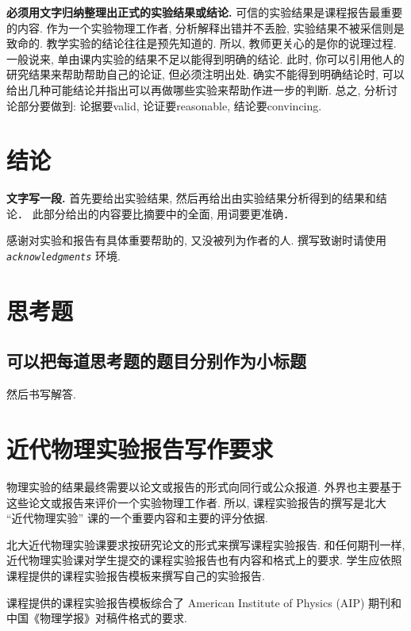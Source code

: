 \documentclass[font=default]{mpltx}
\newcommand{\note}[1]{{\color{gray}#1}}
\newcommand*\env[1]{\textit{\texttt{#1}}}
\begin{document}
\textbf{必须用文字归纳整理出正式的实验结果或结论.}
可信的实验结果是课程报告最重要的内容.
作为一个实验物理工作者, 分析解释出错并不丢脸, 实验结果不被采信则是致命的.
教学实验的结论往往是预先知道的.
所以, 教师更关心的是你的说理过程.
一般说来, 单由课内实验的结果不足以能得到明确的结论.
此时, 你可以引用他人的研究结果来帮助帮助自己的论证, 但必须注明出处.
确实不能得到明确结论时, 可以给出几种可能结论并指出可以再做哪些实验来帮助作进一步的判断.
总之, 分析讨论部分要做到: 论据要valid, 论证要reasonable, 结论要convincing.

\section{结论}
\textbf{文字写一段.}
首先要给出实验结果, 然后再给出由实验结果分析得到的结果和结论．
此部分给出的内容要比摘要中的全面, 用词要更准确．

\begin{acknowledgments}
  感谢对实验和报告有具体重要帮助的, 又没被列为作者的人.
  \note{撰写致谢时请使用 \env{acknowledgments} 环境.}
\end{acknowledgments}



\clearpage %
\appendix %
\section{思考题}\label{app:exercise}
\subsection{可以把每道思考题的题目分别作为小标题}
然后书写解答.

\section{近代物理实验报告写作要求}

物理实验的结果最终需要以论文或报告的形式向同行或公众报道.
外界也主要基于这些论文或报告来评价一个实验物理工作者.
所以, 课程实验报告的撰写是北大 ``近代物理实验'' 课的一个重要内容和主要的评分依据.

北大近代物理实验课要求按研究论文的形式来撰写课程实验报告.
和任何期刊一样, 近代物理实验课对学生提交的课程实验报告也有内容和格式上的要求.
学生应依照课程提供的课程实验报告模板来撰写自己的实验报告.

课程提供的课程实验报告模板综合了 American Institute of Physics (AIP) 期刊和中国《物理学报》对稿件格式的要求.
\end{document}
